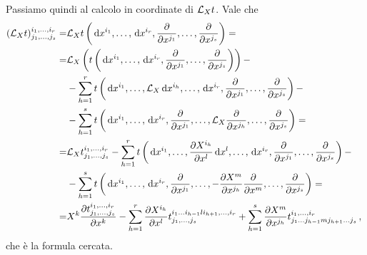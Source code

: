 Passiamo quindi al calcolo in coordinate di $\Lie_Xt$. Vale che
\begin{align*}
	(\Lie_Xt)^{\seqb ir,}_{\seqb js,} =& \Lie_Xt \left(\de x^{i_1},\ldots, \de x^{i_r}, \DerParz{}{x^{j_1}}, \ldots ,\DerParz{}{x^{j_s}}\right) = \\
	=& \Lie_X \left(t\left(\de x^{i_1},\ldots, \de x^{i_r}, \DerParz{}{x^{j_1}}, \ldots ,\DerParz{}{x^{j_s}} \right) \right) -  \\
	&- \sum_{h=1}^r t\left(\de x^{i_1},\ldots, \Lie_X \de x^{i_h},\ldots, \de x^{i_r}, \DerParz{}{x^{j_1}}, \ldots ,\DerParz{}{x^{j_s}} \right) -\\
	&- \sum_{h=1}^s t\left(\de x^{i_1},\ldots, \de x^{i_r}, \DerParz{}{x^{j_1}}, \ldots, \Lie_X\DerParz{}{x^{j_h}},\ldots ,\DerParz{}{x^{j_s}} \right) = \\
	= & \Lie_X t^{\seqb ir,}_{\seqb js,}- \sum_{h=1}^r t\left(\de x^{i_1},\ldots, \DerParz{X^{i_h}}{x^l} \de x^l,\ldots, \de x^{i_r}, \DerParz{}{x^{j_1}}, \ldots ,\DerParz{}{x^{j_s}} \right) -\\
	& - \sum_{h=1}^s t\left(\de x^{i_1},\ldots, \de x^{i_r}, \DerParz{}{x^{j_1}}, \ldots, - \DerParz{X^m}{x^{j_h}} \DerParz{}{x^m},\ldots ,\DerParz{}{x^{j_s}} \right) = \\
	= & X^k \DerParz{t^{\seqb ir,}_{\seqb js,}}{x^k} - \sum_{h=1}^r\DerParz{X^{i_h}}{x^l} t^{i_1\ldots i_{h-1} l i_{h+1},\ldots, i_r}_{\seqb js,} + \sum_{h=1}^s \DerParz{X^m}{x^{j_h}} t^{\seqb ir,} _{j_1 \ldots j_{h-1} m j_{h+1} \ldots j_s} \virgola
\end{align*}
che è la formula cercata.



